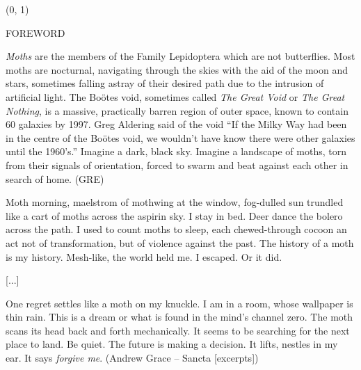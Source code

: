 \documentclass[11pt]{article}
\begin{document}
\begin{textblock}{23}(0, 1)
\begin{center}
\huge FOREWORD
\end{center}
\end{textblock}

\vspace*{0.25\baselineskip}

\begingroup
\begin{center}
\textit{Moths} are the members of the Family Lepidoptera which are not butterflies. Most moths are nocturnal, navigating through the skies with the aid of the moon and stars, sometimes falling astray of their desired path due to the intrusion of artificial light. The Bo\"otes void, sometimes called \textit{The Great Void} or \textit{The Great Nothing}, is a massive, practically barren region of outer space, known to contain 60 galaxies by 1997. Greg Aldering said of the void ``If the Milky Way had been in the centre of the Bo\"otes void, we wouldn't have know there were other galaxies until the 1960's.'' Imagine a dark, black sky. Imagine a landscape of moths, torn from their signals of orientation, forced to swarm and beat against each other in search of home.
\rightskip\leftskip
\phantom{text} \hfill (GRE)

\vspace*{2\baselineskip}

Moth morning, maelstrom of mothwing at the window, fog-dulled sun trundled like a cart of moths across the aspirin sky. I stay in bed. Deer dance the bolero across the path. I used to count moths to sleep, each chewed-through cocoon an act not of transformation, but of violence against the past. The history of a moth is my history. Mesh-like, the world held me. I escaped. Or it did.
\rightskip\leftskip
\phantom{text}

[...]

One regret settles like a moth on my knuckle. I am in a room, whose wallpaper is thin rain. This is a dream or what is found in the mind's channel zero. The moth scans its head back and forth mechanically. It seems to be searching for the next place to land. Be quiet. The future is making a decision. It lifts, nestles in my ear. It says \textit{forgive me}.
\rightskip\leftskip
\phantom{text} \hfill (Andrew Grace -- Sancta [excerpts])
\end{center}
\endgroup

\end{document}
